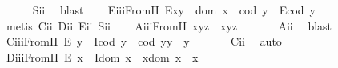 \begin{isabellebody}
%
\isadelimproof
\ \ \ \ %
\endisadelimproof
%
\isatagproof
{}\isamarkupfalse%
\ S\isactrlsub i\isactrlsub i\ \isamarkupfalse%
\ blast%
\endisatagproof
{\isafoldproof}%
%
\isadelimproof
\isanewline
%
\endisadelimproof
\ \ \isamarkupfalse%
\ E\isactrlsub i\isactrlsub i\isactrlsub iFromII{\isacharcolon}\ {\isachardoublequoteopen}E{\isacharparenleft}x{\isasymcdot}y{\isacharparenright}\ \isactrlbold {\isasymleftarrow}\ {\isacharparenleft}dom\ x\ {\isasymcong}\ cod\ y\ \isactrlbold {\isasymand}\ {\isacharparenleft}E{\isacharparenleft}cod\ y{\isacharparenright}{\isacharparenright}{\isacharparenright}{\isachardoublequoteclose}\ \isanewline
%
\isadelimproof
\ \ \ \ %
\endisadelimproof
%
\isatagproof
{}\isamarkupfalse%
\ {\isacharparenleft}metis\ C\isactrlsub i\isactrlsub i\ D\isactrlsub i\isactrlsub i\ E\isactrlsub i\isactrlsub i\ S\isactrlsub i\isactrlsub i{\isacharparenright}%
\endisatagproof
{\isafoldproof}%
%
\isadelimproof
\isanewline
%
\endisadelimproof
\ \ \isamarkupfalse%
\ A\isactrlsub i\isactrlsub i\isactrlsub iFromII{\isacharcolon}\ {\isachardoublequoteopen}x{\isasymcdot}{\isacharparenleft}y{\isasymcdot}z{\isacharparenright}\ {\isasymcong}\ {\isacharparenleft}x{\isasymcdot}y{\isacharparenright}{\isasymcdot}z{\isachardoublequoteclose}\ \isanewline
%
\isadelimproof
\ \ \ \ %
\endisadelimproof
%
\isatagproof
{}\isamarkupfalse%
\ A\isactrlsub i\isactrlsub i\ \isamarkupfalse%
\ blast%
\endisatagproof
{\isafoldproof}%
%
\isadelimproof
\isanewline
%
\endisadelimproof
\ \ \isamarkupfalse%
\ C\isactrlsub i\isactrlsub i\isactrlsub iFromII{\isacharcolon}\ {\isachardoublequoteopen}E\ y\ \isactrlbold {\isasymrightarrow}\ {\isacharparenleft}I{\isacharparenleft}cod\ y{\isacharparenright}\ \isactrlbold {\isasymand}\ {\isacharparenleft}cod\ y{\isacharparenright}{\isasymcdot}y\ {\isasymcong}\ y{\isacharparenright}{\isachardoublequoteclose}\ \isanewline
%
\isadelimproof
\ \ \ \ %
\endisadelimproof
%
\isatagproof
{}\isamarkupfalse%
\ C\isactrlsub i\isactrlsub i\ \isamarkupfalse%
\ auto%
\endisatagproof
{\isafoldproof}%
%
\isadelimproof
\isanewline
%
\endisadelimproof
\ \ \isamarkupfalse%
\ D\isactrlsub i\isactrlsub i\isactrlsub iFromII{\isacharcolon}\ {\isachardoublequoteopen}E\ x\ \isactrlbold {\isasymrightarrow}\ {\isacharparenleft}I{\isacharparenleft}dom\ x{\isacharparenright}\ \isactrlbold {\isasymand}\ x{\isasymcdot}{\isacharparenleft}dom\ x{\isacharparenright}\ {\isasymcong}\ x{\isacharparenright}{\isachardoublequoteclose}\ \isanewline

\end{isabellebody}
